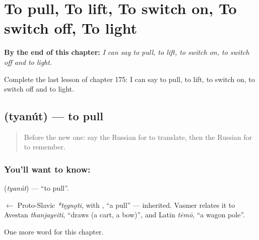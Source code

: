 
\chapter{To pull, To lift, To switch on, To switch off, To light}
\label{ch:ru-to-pull-to-lift-to-switch-on-to-switch-off-to-light}

\begin{chapteropening}
\textbf{By the end of this chapter:} \emph{I can say to pull, to lift, to switch on, to switch off and to light.}

Complete the last lesson of chapter 175: I can say to pull, to lift, to switch on, to switch off and to light.
\end{chapteropening}

\section[\texorpdfstring{\ru{тянуть} (tyanút)}{тянуть (tyanút)}]{ (tyanút) — to pull}

\label{lesson:RU-C175-tyanut}



\begin{quote}
Before the new one: say the Russian for to translate, then the Russian for to remember.
\end{quote}

\subsection*{You'll want to know: }
\textbf{} (\emph{tyanút}) — \textquotedblleft{}to pull\textquotedblright{}.

\begin{cousinweb}
\textbf{} $\leftarrow$ Proto-Slavic \emph{*tęgnǫti}, with \emph{}, \textquotedblleft{}a pull\textquotedblright{} — inherited. Vasmer relates it to Avestan \emph{thanjayeiti}, \textquotedblleft{}draws (a cart, a bow)\textquotedblright{}, and Latin \emph{tēmō}, \textquotedblleft{}a wagon pole\textquotedblright{}.
\end{cousinweb}

\begin{grammarlens}[title={What you've built}]
One more word for this chapter.
\end{grammarlens}

